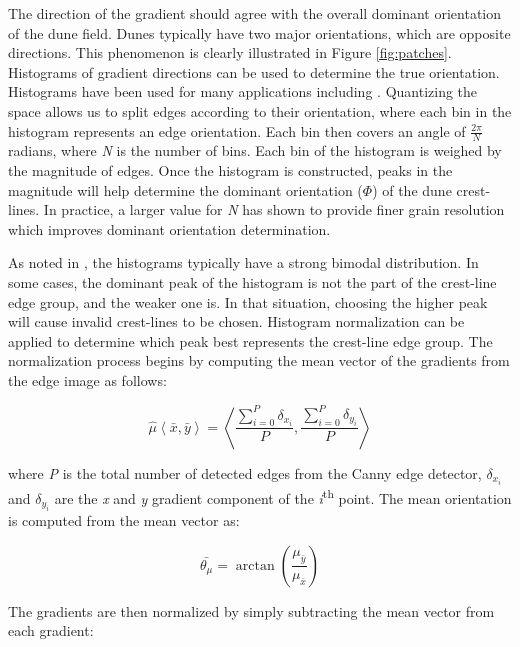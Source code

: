 The direction of the gradient should agree with the overall dominant orientation of the dune field. Dunes typically have two major orientations, which are opposite directions. This phenomenon is clearly illustrated in Figure \ref{fig:patches}. Histograms of gradient directions can be used to determine the true orientation. Histograms have been used for many applications including \cite{lowe_sift_paper, dalal_histogram_oriented_gradients_human_detection, hu_gradient_field_descriptor}. Quantizing the space allows us to split edges according to their orientation, where each bin in the histogram represents an edge orientation. Each bin then covers an angle of $\frac{2\pi}{N}$radians, where \emph{N} is the number of bins. Each bin of the histogram is weighed by the magnitude of edges. Once the histogram is constructed, peaks in the magnitude will help determine the dominant orientation ($\varPhi$) of the dune crest-lines. In practice, a larger value for \emph{N} has shown to provide finer grain resolution which improves dominant orientation determination. 

As noted in \cite{2015_automated_mapping_of_linear_dunefield}, the histograms typically have a strong bimodal distribution. In some cases, the dominant peak of the histogram is not the part of the crest-line edge group, and the weaker one is. In that situation, choosing the higher peak will cause invalid crest-lines to be chosen. Histogram normalization can be applied to determine which peak best represents the crest-line edge group. The normalization process begins by computing the mean vector of the gradients from the edge image as follows:

\begin{equation}
\hat{\mu}\left\langle \bar{x},\bar{y}\right\rangle =\left\langle \frac{\sum_{i=0}^{P}\delta_{x_{i}}}{P},\frac{\sum_{i=0}^{P}\delta_{y_{i}}}{P}\right\rangle 
\end{equation}

where \emph{P} is the total number of detected edges from the Canny edge detector, $\delta_{x_{i}}$ and $\delta_{y_{i}}$ are the \emph{x} and \emph{y} gradient component of the \emph{i}\textsuperscript{th} point. The mean orientation is computed from the mean vector as:

\begin{equation}
\bar{\theta_{\mu}}=\arctan\left(\frac{\mu_{\bar{y}}}{\mu_{\bar{x}}}\right)
\end{equation}

The gradients are then normalized by simply subtracting the mean vector from each gradient:

